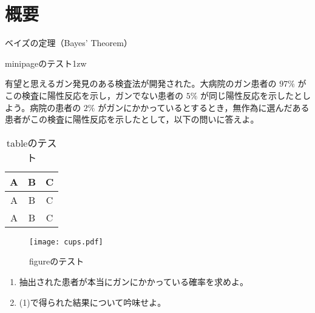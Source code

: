\makeatletter
\def\dumyword#1{\@tempcnta=#1\relax
	\loop\ifnum\@tempcnta>\z@\advance\@tempcnta-\@ne
	□\repeat
	}
\makeatother

\chapter{概要}
\begin{abstract}
\dumyword{60}
\end{abstract}



\begin{問題}[標準]{ベイズの定理（Bayes' Theorem）}
\begin{minipage}{.5\linewidth}\textsf{minipageのテスト}\parindent1zw\par
有望と思えるガン発見のある検査法が開発された。大病院のガン患者の $97\%$ がこの検査に陽性反応を示し，ガンでない患者の $5\%$ が同じ陽性反応を示したとしよう。病院の患者の $2\%$ がガンにかかっているとするとき，無作為に選んだある患者がこの検査に陽性反応を示したとして，以下の問いに答えよ。
\end{minipage}
\begin{table}\centering
	\caption{tableのテスト}
	\begin{tabular}{|c|c|c|}
		\hline
		A & B & C\\
		\hline
		A & B & C\\
		\hline
		A & B & C\\
		\hline
	\end{tabular}
\end{table}
\begin{figure}\centering
\texttt{[image: cups.pdf]}
	\caption{figureのテスト}
\end{figure}

\begin{enumerate}
\item 抽出された患者が本当にガンにかかっている確率を求めよ。
\item (1)で得られた結果について吟味せよ。
\end{enumerate}

\end{問題}



